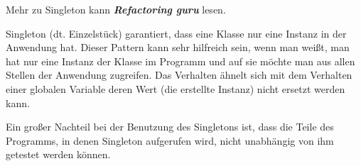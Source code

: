 Mehr zu Singleton kann \textit{\textbf{Refactoring guru}} lesen.

Singleton (dt. Einzelstück) garantiert, dass eine Klasse nur eine Instanz in der Anwendung hat.
Dieser Pattern kann sehr hilfreich sein, wenn man weißt, man hat nur eine Instanz der Klasse im Programm 
und auf sie möchte man aus allen Stellen der Anwendung zugreifen.
Das Verhalten ähnelt sich mit dem Verhalten einer 
globalen Variable deren Wert (die erstellte Instanz) nicht ersetzt werden kann.

Ein großer Nachteil bei der Benutzung des Singletons ist, 
dass die Teile des Programms, in denen Singleton aufgerufen wird, nicht unabhängig von ihm getestet werden können.